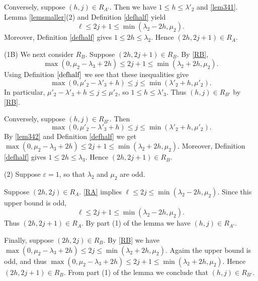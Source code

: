 \documentclass[11pt]{amsart}
\theoremstyle{remark}
\theoremstyle{definition}
\newcommand{\la}{\lambda}
\numberwithin{equation}{section}
\begin{document}
Conversely, suppose $(h,j)\in R_{A'}$.
Then we have $1\le h\le\la'_2$ and \eqref{lem341}.
Lemma \ref{lemsmaller}(2) and
Definition \ref{defhalf} yield
\[
\ell\le2j+1\le\min(\la_2-2h,\mu_2).
\]
Moreover, Definition \ref{defhalf} gives
$1\le2h\le\la_2$.
Hence $(2h,2j+1)\in R_A$.

(1B) We next consider $R_B$. Suppose $(2h,2j+1)\in R_B$.
By \eqref{RB},
\[
\max(0,\mu_2-\la_3+2h)
\le2j+1\le\min(\la_2+2h,\mu_2).
\]
Using Definition \(\ref{defhalf}\) we see that these inequalities give
\[
\max(0,\mu'_2-\la'_3+h)
\le j\le\min(\la'_2+h,\mu'_2).
\]
In particular,
$\mu'_2-\la'_3+h\le j\le\mu'_2$,
so $1\le h\le\la'_3$.
Thus $(h,j)\in R_{B'}$ by \eqref{RB}.

Conversely, suppose $(h,j)\in R_{B'}$.
Then
\begin{equation}\label{lem342}
	\max(0,\mu'_2-\la'_3+h)
	\le j\le\min(\la'_2+h,\mu'_2).
\end{equation}
By \eqref{lem342} and Definition \ref{defhalf} we get
$
\max(0,\mu_2-\la_3+2h)
\le2j+1\le\min(\la_2+2h,\mu_2).
$
Moreover, Definition \ref{defhalf} gives
$1\le2h\le\la_3$.
Hence $(2h,2j+1)\in R_B$.

(2) Suppose $\varepsilon=1$, so that
$\la_2$ and $\mu_2$ are odd.

Suppose $(2h,2j)\in R_A$. \eqref{RA} implies
$
\ell\le2j\le\min(\la_2-2h,\mu_2).
$
Since this upper bound is odd,
\[
\ell\le2j+1\le\min(\la_2-2h,\mu_2).
\]
Thus
$(2h,2j+1)\in R_A$. By part (1) of the lemma we have
$(h,j)\in R_{A'}$.

Finally, suppose $(2h,2j)\in R_B$.
By \eqref{RB} we have
$
\max(0,\mu_2-\la_3+2h)
\le2j\le\min(\la_2+2h,\mu_2).
$
Agaim the upper bound is odd, and thus 
$
\max(0,\mu_2-\la_3+2h)
\le2j+1\le\min(\la_2+2h,\mu_2).
$
Hence 
$(2h,2j+1)\in R_B$. From part  (1) of the lemma we conclude that
$(h,j)\in R_{B'}$.
\end{document}

